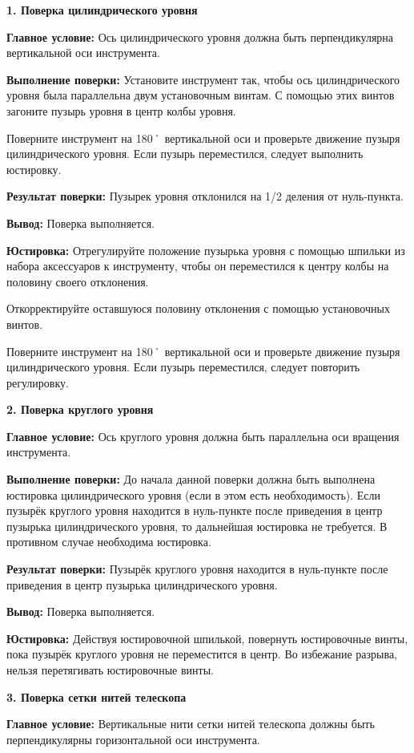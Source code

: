 \documentclass[a4paper]{article}
\begin{document}
\large{\textbf{1. Поверка цилиндрического уровня}
\par \textbf{Главное условие:} Ось цилиндрического уровня должна быть перпендикулярна вертикальной оси инструмента.
\par \textbf{Выполнение поверки:} Установите инструмент так, чтобы ось цилиндрического уровня была параллельна
двум установочным винтам. С помощью этих винтов загоните пузырь уровня в центр колбы уровня.
\par Поверните инструмент на 180˚ вертикальной оси и проверьте движение пузыря цилиндрического уровня. Если пузырь переместился, следует выполнить юстировку.
\par \textbf{Результат поверки:} Пузырек уровня отклонился на 1/2 деления от нуль-пункта.
\par\textbf{Вывод:} Поверка выполняется.
\par \textbf{Юстировка:} Отрегулируйте положение пузырька уровня с помощью шпильки из набора
аксессуаров к инструменту, чтобы он переместился к центру колбы на половину своего отклонения.
\par Откорректируйте оставшуюся половину отклонения с помощью установочных
винтов.
\par Поверните инструмент на 180˚ вертикальной оси и проверьте движение пузыря цилиндрического уровня. Если пузырь переместился, следует повторить регулировку.
\par\textbf{2. Поверка круглого уровня}
\par \textbf{Главное условие:} Ось круглого уровня должна быть параллельна оси вращения инструмента.
\par \textbf{Выполнение поверки:} До начала данной поверки должна быть выполнена юстировка цилиндрического уровня (если в этом есть необходимость). Если пузырёк круглого уровня находится в нуль-пункте после приведения в центр пузырька цилиндрического уровня, то дальнейшая юстировка не требуется. В противном случае необходима юстировка. 
\par \textbf{Результат поверки:} Пузырёк круглого уровня находится в нуль-пункте после приведения в центр пузырька цилиндрического уровня.
\par\textbf{Вывод:} Поверка выполняется.
\par \textbf{Юстировка:} Действуя юстировочной шпилькой, повернуть юстировочные винты, пока пузырёк круглого уровня не переместится в центр. Во избежание разрыва, нельзя перетягивать юстировочные винты.
\par\textbf{3. Поверка сетки нитей телескопа}
\par \textbf{Главное условие:} Вертикальные нити сетки нитей телескопа должны быть перпендикулярны горизонтальной оси инструмента.
}
\end{document}
